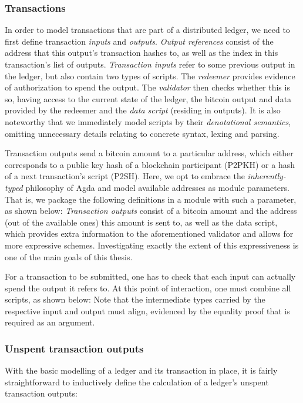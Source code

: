 \documentclass[acmsmall,nonacm=true,screen=true]{acmart}
\begin{document}
\subsubsection{Transactions}
In order to model transactions that are part of a distributed ledger, we need to first define
transaction \textit{inputs} and \textit{outputs}.
\UTXOinsOutRefs{}
\textit{Output references} consist of the address that this output's transaction hashes to, 
as well as the index in this transaction's list of outputs.
\textit{Transaction inputs} refer to some previous output in the ledger, but also contain two types of scripts.
The \textit{redeemer} provides evidence of authorization to spend the output.
The \textit{validator} then checks whether this is so, having access to the current state of the ledger, the bitcoin output
and data provided by the redeemer and the \textit{data script} (residing in outputs).
It is also noteworthy that we immediately model scripts by their \textit{denotational semantics},
omitting unnecessary details relating to concrete syntax, lexing and parsing.

Transaction outputs send a bitcoin amount to a particular address, which either corresponds to a public key hash of a
blockchain participant (P2PKH) or a hash of a next transaction's script (P2SH).
Here, we opt to embrace the \textit{inherently-typed} philosophy of Agda and model available addresses as module parameters.
That is, we package the following definitions in a module with such a parameter, as shown below:
\UTXOoutTx{}
\textit{Transaction outputs} consist of a bitcoin amount and the address (out of the available ones) this amount is sent to,
as well as the data script, which provides extra information to the aforementioned validator and allows for more expressive schemes.
Investigating exactly the extent of this expressiveness is one of the main goals of this thesis.

For a transaction to be submitted, one has to check that each input can actually spend the output it refers to.
At this point of interaction, one must combine all scripts, as shown below:
\UTXOrunValidation{}
Note that the intermediate types carried by the respective input and output must align, evidenced by the
equality proof that is required as an argument.

\subsubsection{Unspent transaction outputs}
With the basic modelling of a ledger and its transaction in place, it is fairly straightforward to 
inductively define the calculation of a ledger's unspent transaction outputs:
\UTXOutxo{}
\end{document}
